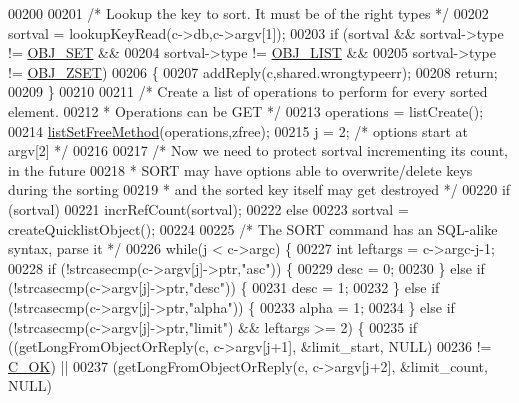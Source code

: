 \begin{DoxyCode}
00200 
00201     \textcolor{comment}{/* Lookup the key to sort. It must be of the right types */}
00202     sortval = lookupKeyRead(c->db,c->argv[1]);
00203     \textcolor{keywordflow}{if} (sortval && sortval->type != \hyperlink{server_8h_a8d179375a4aac33d3fa7aa80c8ccc75f}{OBJ\_SET} &&
00204                    sortval->type != \hyperlink{server_8h_a4a5f22a280949c97a0cb0d4213275126}{OBJ\_LIST} &&
00205                    sortval->type != \hyperlink{server_8h_a8c356422ddbc03bd77694880a30a1953}{OBJ\_ZSET})
00206     \{
00207         addReply(c,shared.wrongtypeerr);
00208         \textcolor{keywordflow}{return};
00209     \}
00210 
00211     \textcolor{comment}{/* Create a list of operations to perform for every sorted element.}
00212 \textcolor{comment}{     * Operations can be GET */}
00213     operations = listCreate();
00214     \hyperlink{adlist_8h_a648e4a2d20decff3182a72a608b0b8f2}{listSetFreeMethod}(operations,zfree);
00215     j = 2; \textcolor{comment}{/* options start at argv[2] */}
00216 
00217     \textcolor{comment}{/* Now we need to protect sortval incrementing its count, in the future}
00218 \textcolor{comment}{     * SORT may have options able to overwrite/delete keys during the sorting}
00219 \textcolor{comment}{     * and the sorted key itself may get destroyed */}
00220     \textcolor{keywordflow}{if} (sortval)
00221         incrRefCount(sortval);
00222     \textcolor{keywordflow}{else}
00223         sortval = createQuicklistObject();
00224 
00225     \textcolor{comment}{/* The SORT command has an SQL-alike syntax, parse it */}
00226     \textcolor{keywordflow}{while}(j < c->argc) \{
00227         \textcolor{keywordtype}{int} leftargs = c->argc-j-1;
00228         \textcolor{keywordflow}{if} (!strcasecmp(c->argv[j]->ptr,\textcolor{stringliteral}{"asc"})) \{
00229             desc = 0;
00230         \} \textcolor{keywordflow}{else} \textcolor{keywordflow}{if} (!strcasecmp(c->argv[j]->ptr,\textcolor{stringliteral}{"desc"})) \{
00231             desc = 1;
00232         \} \textcolor{keywordflow}{else} \textcolor{keywordflow}{if} (!strcasecmp(c->argv[j]->ptr,\textcolor{stringliteral}{"alpha"})) \{
00233             alpha = 1;
00234         \} \textcolor{keywordflow}{else} \textcolor{keywordflow}{if} (!strcasecmp(c->argv[j]->ptr,\textcolor{stringliteral}{"limit"}) && leftargs >= 2) \{
00235             \textcolor{keywordflow}{if} ((getLongFromObjectOrReply(c, c->argv[j+1], &limit\_start, NULL)
00236                  != \hyperlink{server_8h_a303769ef1065076e68731584e758d3e1}{C\_OK}) ||
00237                 (getLongFromObjectOrReply(c, c->argv[j+2], &limit\_count, NULL)

\end{DoxyCode}
